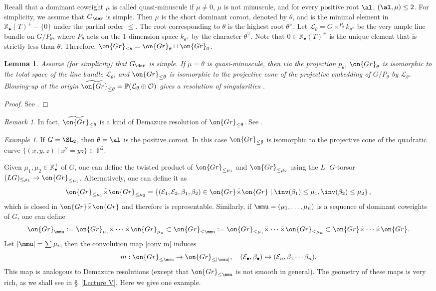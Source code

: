 \documentclass[]{pcmi}
\theoremstyle{plain}
\newtheorem{lem}[equation]{Lemma}
\theoremstyle{remark}
\newtheorem{ex}[equation]{Example}
\newtheorem{rmk}[equation]{Remark}
\theoremstyle{definition}
\newcommand{\bP}{{\mathbb P}}
\newcommand{\mE}{{\mathcal E}}
\newcommand{\mL}{{\mathcal L}}
\newcommand{\mO}{{\mathcal O}}
\newcommand{\Gr}{{\on{Gr}}}
\def\xcoch{\mathbb{X}_\bullet}
\begin{document}
Recall that a dominant coweight $\mu$ is called quasi-minuscule if $\mu\neq 0$, $\mu$ is not minuscule, and for every positive root $\al$, $(\al,\mu)\leq 2$. For simplicity, we assume that $G_\der$ is simple.
Then $\mu$ is the short dominant coroot, denoted by $\theta$, and is the minimal element in $\xcoch(T)^+-\{0\}$ under the partial order $\leq$.  The root corresponding to $\theta$ is the highest root $\theta^\vee$. Let $\mL_\theta=G\times^{P_\theta} k_{\theta^\vee}$ be the very ample line bundle on $G/P_\theta$, where $P_\theta$ acts on the $1$-dimension space $k_{\theta^\vee}$ by the character $\theta^\vee$. 
Note that $0\in\xcoch(T)^+$ is the unique element that is strictly less than $\theta$. Therefore, $\Gr_{\leq \theta}=\Gr_\theta\sqcup \Gr_0$.
\begin{lem}\label{quasiminusch}
Assume (for simplicity) that $G_\der$ is simple. If $\mu=\theta$ is quasi-minuscule, then via the projection $p_\theta$, $\Gr_\theta$ is isomorphic to the total space of the line bundle $\mL_\theta$,
and $\Gr_{\leq \theta}$ is isomorphic to the projective cone of the projective embedding of $G/P_\theta$ by $\mL_\theta$. Blowing-up at the origin $\widetilde{\Gr}_{\leq \theta}= \bP(\mL_{\theta}\oplus \mO)$ gives a resolution of singularities . 
\end{lem}
\begin{proof}See \cite[\S\ 7]{NP}.
\end{proof}
\begin{rmk}
In fact, $\widetilde{\Gr}_{\leq \theta}$ is a kind of Demazure resolution of $\Gr_{\leq \theta}$. See \cite[Lemma 2.12]{Z14}.
\end{rmk}
\begin{ex}If $G=\SL_2$, then $\theta=\al$ is the positive coroot. In this case $\Gr_{\leq \theta}$ is isomorphic to the projective cone of the quadratic curve $\{(x,y,z)\mid x^2=yz\}\subset \bP^2$. 
\end{ex}

Given $\mu_1,\mu_2\in \xcoch^+$ of $G$, one can define the twisted product of $\Gr_{\leq \mu_1}$ and $\Gr_{\leq \mu_2}$ using the $L^+G$-torsor $(LG)_{\leq \mu_1}\to \Gr_{\leq \mu_1}$. Alternatively, one can define it as
\[\Gr_{\leq \mu_1}\tilde{\times}\Gr_{\leq \mu_2}=\left\{(\mE_1,\mE_2,\beta_1,\beta_2)\in\Gr\tilde\times\Gr\mid \inv(\beta_1)\leq \mu_1, \inv(\beta_2)\leq \mu_2\right\},\]
which is closed in $\Gr\tilde\times\Gr$ and therefore is representable. Similarly,  if $\mmu=(\mu_1,\ldots,\mu_n)$ is a sequence of dominant coweights of $G$, one can define
$$\Gr_{\mmu}:=\Gr_{\mu_1}\tilde\times\cdots\tilde\times\Gr_{\mu_n}\subset \Gr_{\leq\mmu}:=\Gr_{\leq \mu_1}\tilde\times\cdots\tilde\times\Gr_{\leq \mu_n}\subset\Gr\tilde\times\cdots\tilde\times\Gr.$$ 
Let $|\mmu|=\sum \mu_i$, then the convolution map \eqref{conv m} induces
\begin{equation}\label{conv m2}
m: \Gr_{\leq \mmu}\to \Gr_{\leq |\mmu|}, \quad (\mE_\bullet,\beta_\bullet)\mapsto (\mE_n,\beta_1\cdots\beta_n).
\end{equation}
This map is analogous to Demazure resolutions (except that $\Gr_{\leq \mmu}$ is not smooth in general). The geometry of these maps is very rich, as we shall see in \S~\ref{Lecture V}. Here we give one example.
\end{document}
